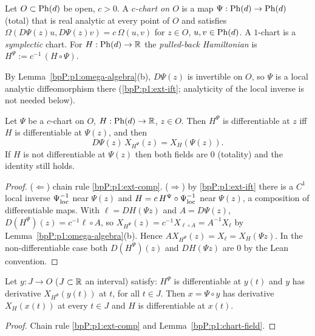 \begin{definition}[Chart]\label{bpP:p1:chart}
Let $O\subset\mathrm{Ph}(d)$ be open, $c>0$. A \emph{$c$-chart on $O$} is a map $\Psi:\mathrm{Ph}(d)\to\mathrm{Ph}(d)$ (total) that is real analytic at every point of $O$ and satisfies $\Omega(D\Psi(z)u,D\Psi(z)v)=c\,\Omega(u,v)$ for $z\in O$, $u,v\in\mathrm{Ph}(d)$. A $1$-chart is a \emph{symplectic} chart. For $H:\mathrm{Ph}(d)\to\mathbb{R}$ the \emph{pulled-back Hamiltonian} is $H^\Psi:=c^{-1}\,(H\circ\Psi)$.
\end{definition}
By Lemma~\ref{bpP:p1:omega-algebra}(b), $D\Psi(z)$ is invertible on $O$, so $\Psi$ is a local analytic diffeomorphism there (\ref{bpP:p1:ext-ift}; analyticity of the local inverse is not needed below).

\begin{lemma}\label{bpP:p1:chart-field}
Let $\Psi$ be a $c$-chart on $O$, $H:\mathrm{Ph}(d)\to\mathbb{R}$, $z\in O$. Then $H^\Psi$ is differentiable at $z$ iff $H$ is differentiable at $\Psi(z)$, and then
\[D\Psi(z)\,X_{H^\Psi}(z)=X_H(\Psi(z)).\]
If $H$ is not differentiable at $\Psi(z)$ then both fields are $0$ (totality) and the identity still holds.
\end{lemma}
\begin{proof}
\label{stepP:p1:cf-diff} ($\Leftarrow$) chain rule \ref{bpP:p1:ext-comp}. ($\Rightarrow$) by \ref{bpP:p1:ext-ift} there is a $C^1$ local inverse $\Psi^{-1}_{\rm loc}$ near $\Psi(z)$ and $H=c\,H^\Psi\circ\Psi^{-1}_{\rm loc}$ near $\Psi(z)$, a composition of differentiable maps.
\label{stepP:p1:cf-field} With $\ell=DH(\Psi z)$ and $A=D\Psi(z)$, $D(H^\Psi)(z)=c^{-1}\ell\circ A$, so $X_{H^\Psi}(z)=c^{-1}X_{\ell\circ A}=A^{-1}X_\ell$ by Lemma~\ref{bpP:p1:omega-algebra}(b). Hence $AX_{H^\Psi}(z)=X_\ell=X_H(\Psi z)$. In the non-differentiable case both $D(H^\Psi)(z)$ and $DH(\Psi z)$ are $0$ by the Lean convention.
\end{proof}

\begin{corollary}\label{bpP:p1:chart-orbit}
Let $y:J\to O$ ($J\subset\mathbb{R}$ an interval) satisfy: $H^\Psi$ is differentiable at $y(t)$ and $y$ has derivative $X_{H^\Psi}(y(t))$ at $t$, for all $t\in J$. Then $x=\Psi\circ y$ has derivative $X_H(x(t))$ at every $t\in J$ and $H$ is differentiable at $x(t)$.
\end{corollary}
\begin{proof}
Chain rule \ref{bpP:p1:ext-comp} and Lemma~\ref{bpP:p1:chart-field}.
\end{proof}

